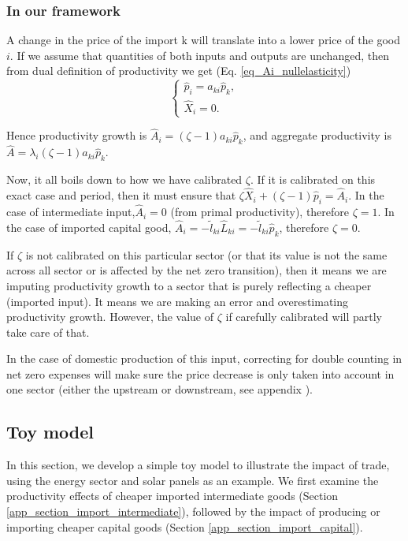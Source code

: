 \documentclass[11pt]{article}
\begin{document}
\subsubsection{In our framework}

A change in the price of the import k will translate into a lower price of the good $i$. If we assume that quantities of both inputs and outputs are unchanged, then from dual definition of productivity we get (Eq. \ref{eq_Ai_nullelasticity})
\begin{equation*}
\begin{cases}
     \hat{p}_i= a_{k i} \hat{p}_{k},\\
     \hat{X}_i=0.
\end{cases}
\end{equation*}

Hence productivity growth is $\hat{A}_i=(\zeta-1)a_{k i} \hat{p}_{k}$,
and aggregate productivity is $\hat{A}=\lambda_i(\zeta-1)a_{k i} \hat{p}_{k}$.

\vspace{3mm}

Now, it all boils down to how we have calibrated $\zeta$. If it is calibrated on this exact case and period, then it must ensure that $\zeta \hat{X}_i+(\zeta-1) \hat{p}_i=\hat{A}_i$. In the case of intermediate input,$\hat{A}_i=0$ (from primal productivity), therefore $\zeta=1$. In the case of imported capital good, $\hat{A}_i=-\tilde{l}_{ki}\hat{L}_{ki}=-\tilde{l}_{ki}\hat{p}_{k}$, therefore $\zeta=0$.


If $\zeta$ is not calibrated on this particular sector (or that its value is not the same across all sector or is affected by the net zero transition), then it means we are imputing productivity growth to a sector that is purely reflecting a cheaper (imported input). It means we are making an error and overestimating productivity growth. However, the value of $\zeta$ if carefully calibrated will partly take care of that. 

In the case of domestic production of this input, correcting for double counting in net zero expenses will make sure the price decrease is only taken into account in one sector (either the upstream or downstream, see appendix ).

\subsection{Toy model}
In this section, we develop a simple toy model to illustrate the impact of trade, using the energy sector and solar panels as an example. We first examine the productivity effects of cheaper imported intermediate goods (Section \ref{app_section_import_intermediate}), followed by the impact of producing or importing cheaper capital goods (Section \ref{app_section_import_capital}).
\end{document}

